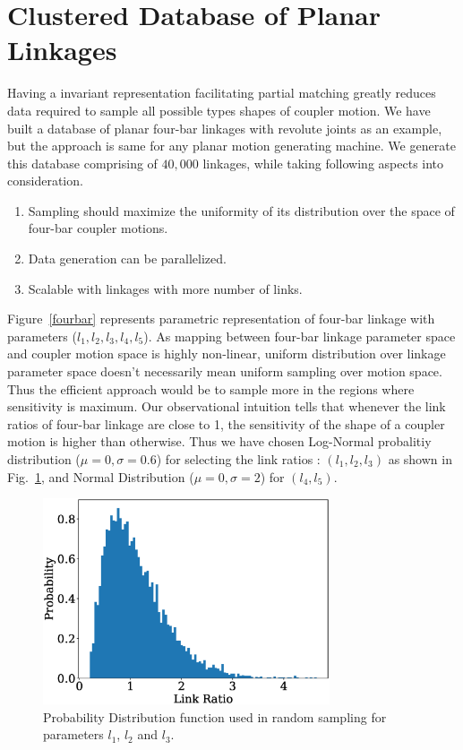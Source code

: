 \documentclass[twocolumn,10pt]{asme2e}
\begin{document}
\section{Clustered Database of Planar Linkages}\label{sec_db_ae}
Having a invariant representation facilitating partial matching greatly reduces data required to sample all possible types shapes of coupler motion.
We have built a database of planar four-bar linkages with revolute joints as an example, but the approach is same for any planar motion generating machine.
We generate this database comprising of $40,000$ linkages, while taking following aspects into consideration.
\begin{enumerate}
  \item Sampling should maximize the uniformity of its distribution over the space of four-bar coupler motions.
  \item Data generation can be parallelized.
  \item Scalable with linkages with more number of links.
\end{enumerate}
Figure~\ref{fourbar} represents parametric representation of four-bar linkage with parameters ($l_1,l_2,l_3,l_4,l_5$).
As mapping between four-bar linkage parameter space and coupler motion space is highly non-linear, uniform distribution over linkage parameter space doesn't necessarily mean uniform sampling over motion space.
Thus the efficient approach would be to sample more in the regions where sensitivity is maximum.
Our observational intuition tells that whenever the link ratios of four-bar linkage are close to 1, the sensitivity of the shape of a coupler motion is higher than otherwise.
Thus we have chosen Log-Normal probalitiy distribution ($\mu = 0,\sigma = 0.6 $) for selecting the link ratios : $(l_1, l_2, l_3)$ as shown in Fig.~\ref{logNormal}, and Normal Distribution ($\mu = 0,\sigma = 2 $) for $(l_4, l_5)$.

\begin{figure}
\centering
\includegraphics[width=240pt]{figure/fig_logNormal.eps}
  \caption{Probability Distribution function used in random sampling for parameters $l_1$, $l_2$ and $l_3$.}
\label{logNormal}
\end{figure}
\end{document}
